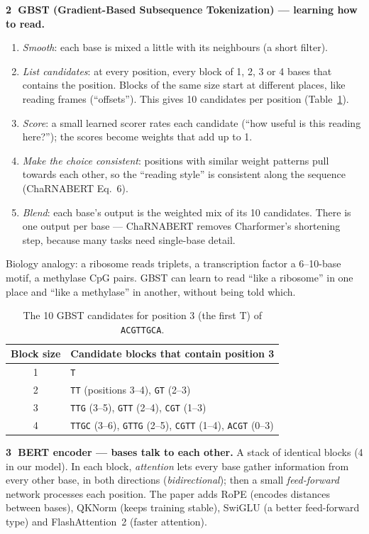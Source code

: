 \documentclass[11pt,a4paper]{article}
\newcommand{\code}[1]{\texttt{\small #1}}
\begin{document}
\textbf{\textcircled{2} GBST (Gradient-Based Subsequence Tokenization) --- learning how to read.}
\begin{enumerate}
\item \emph{Smooth}: each base is mixed a little with its neighbours (a short filter).
\item \emph{List candidates}: at every position, every block of 1, 2, 3 or 4 bases that contains
  the position. Blocks of the same size start at different places, like reading frames
  (``offsets''). This gives 10 candidates per position (Table~\ref{tab:gbst}).
\item \emph{Score}: a small learned scorer rates each candidate (``how useful is this reading
  here?''); the scores become weights that add up to 1.
\item \emph{Make the choice consistent}: positions with similar weight patterns pull towards
  each other, so the ``reading style'' is consistent along the sequence (ChaRNABERT Eq.~6).
\item \emph{Blend}: each base's output is the weighted mix of its 10 candidates. There is one
  output per base --- ChaRNABERT removes Charformer's shortening step, because many tasks need
  single-base detail.
\end{enumerate}
Biology analogy: a ribosome reads triplets, a transcription factor a 6--10-base motif, a methylase
CpG pairs. GBST can learn to read ``like a ribosome'' in one place and ``like a methylase'' in
another, without being told which.

\begin{table}[h]
\centering
\caption{The 10 GBST candidates for position 3 (the first T) of \code{ACGTTGCA}.}
\label{tab:gbst}
\small
\begin{tabular}{cl}
\toprule
Block size & Candidate blocks that contain position 3 \\
\midrule
1 & \code{T} \\
2 & \code{TT} (positions 3--4), \code{GT} (2--3) \\
3 & \code{TTG} (3--5), \code{GTT} (2--4), \code{CGT} (1--3) \\
4 & \code{TTGC} (3--6), \code{GTTG} (2--5), \code{CGTT} (1--4), \code{ACGT} (0--3) \\
\bottomrule
\end{tabular}
\end{table}

\textbf{\textcircled{3} BERT encoder --- bases talk to each other.} A stack of identical blocks
(4 in our model). In each block, \emph{attention} lets every base gather information from every
other base, in both directions (\emph{bidirectional}); then a small \emph{feed-forward} network
processes each position. The paper adds RoPE (encodes distances between bases), QKNorm (keeps
training stable), SwiGLU (a better feed-forward type) and FlashAttention~2 (faster attention).
\end{document}
